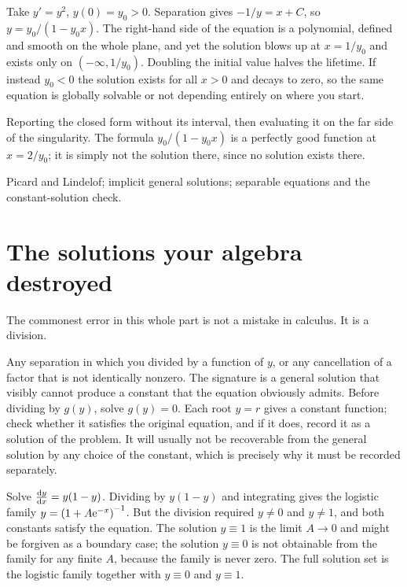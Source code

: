 \begin{worked}
Take $y'=y^2$, $y(0)=y_0>0$. Separation gives $-1/y=x+C$, so $y=y_0/(1-y_0x)$. The right-hand side of the equation is a polynomial, defined and smooth on the whole plane, and yet the solution blows up at $x=1/y_0$ and exists only on $(-\infty,1/y_0)$. Doubling the initial value halves the lifetime. If instead $y_0<0$ the solution exists for all $x>0$ and decays to zero, so the same equation is globally solvable or not depending entirely on where you start.
\end{worked}

\begin{trap}
Reporting the closed form without its interval, then evaluating it on the far side of the singularity. The formula $y_0/(1-y_0x)$ is a perfectly good function at $x=2/y_0$; it is simply not the solution there, since no solution exists there.
\end{trap}

\begin{seealsob}Picard and Lindelof; implicit general solutions; separable equations and the constant-solution check.\end{seealsob}

\section{The solutions your algebra destroyed}

The commonest error in this whole part is not a mistake in calculus. It is a division.

\cue Any separation in which you divided by a function of $y$, or any cancellation of a factor that is not identically nonzero. The signature is a general solution that visibly cannot produce a constant that the equation obviously admits.
\method Before dividing by $g(y)$, solve $g(y)=0$. Each root $y=r$ gives a constant function; check whether it satisfies the original equation, and if it does, record it as a solution of the problem. It will usually not be recoverable from the general solution by any choice of the constant, which is precisely why it must be recorded separately.

\begin{worked}
Solve $\frac{\mathrm{d}y}{\mathrm{d}x}=y(1-y)$. Dividing by $y(1-y)$ and integrating gives the logistic family $y=\left(1+A\mathrm{e}^{-x}\right)^{-1}$. But the division required $y\neq0$ and $y\neq1$, and both constants satisfy the equation. The solution $y\equiv1$ is the limit $A\to0$ and might be forgiven as a boundary case; the solution $y\equiv0$ is not obtainable from the family for any finite $A$, because the family is never zero. The full solution set is the logistic family together with $y\equiv0$ and $y\equiv1$.
\end{worked}

